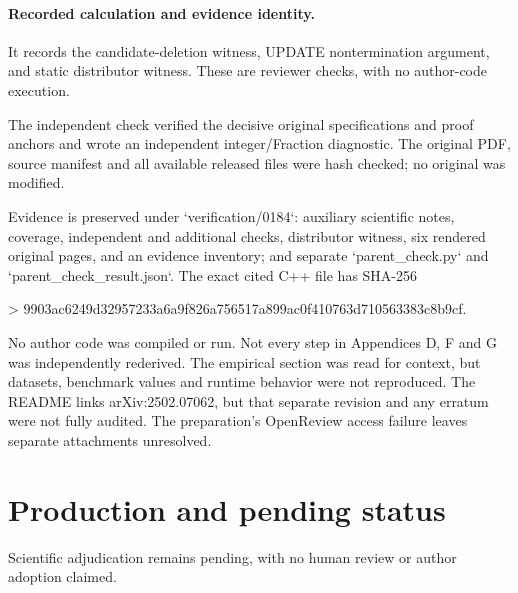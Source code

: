 \documentclass[10pt]{article}
\begin{document}
\paragraph*{Recorded calculation and evidence identity.}\mbox{}\par
It records the candidate-deletion witness, UPDATE nontermination argument, and static distributor witness. These are reviewer checks, with no author-code execution.\par
The independent check verified the decisive original specifications and proof anchors and wrote an independent integer/Fraction diagnostic. The original PDF, source manifest and all available released files were hash checked; no original was modified.\par
Evidence is preserved under `verification/0184`: auxiliary scientific notes, coverage, independent and additional checks, distributor witness, six rendered original pages, and an evidence inventory; and separate `parent\_check.py` and `parent\_check\_result.json`. The exact cited C++ file has SHA-256\par
> 9903ac6249d32957233a6a9f826a756517a899ac0f410763d710563383c8b9cf.\par
No author code was compiled or run. Not every step in Appendices D, F and G was independently rederived. The empirical section was read for context, but datasets, benchmark values and runtime behavior were not reproduced. The README links arXiv:2502.07062, but that separate revision and any erratum were not fully audited. The preparation’s OpenReview access failure leaves separate attachments unresolved.\par
\section*{Production and pending status}
Scientific adjudication remains pending, with no human review or author adoption claimed.\par
\end{document}
